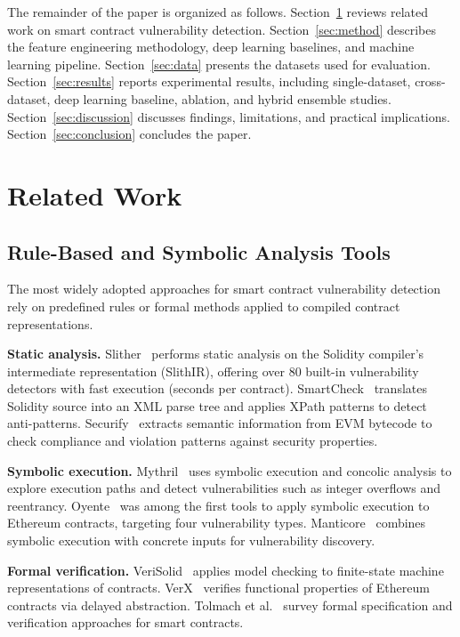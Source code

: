 \documentclass[11pt,a4paper]{article}
\begin{document}
The remainder of the paper is organized as follows.
Section~\ref{sec:related} reviews related work on smart contract vulnerability detection.
Section~\ref{sec:method} describes the feature engineering methodology, deep learning baselines, and machine learning pipeline.
Section~\ref{sec:data} presents the datasets used for evaluation.
Section~\ref{sec:results} reports experimental results, including single-dataset, cross-dataset, deep learning baseline, ablation, and hybrid ensemble studies.
Section~\ref{sec:discussion} discusses findings, limitations, and practical implications.
Section~\ref{sec:conclusion} concludes the paper.

\section{Related Work}
\label{sec:related}

\subsection{Rule-Based and Symbolic Analysis Tools}

The most widely adopted approaches for smart contract vulnerability detection rely on predefined rules or formal methods applied to compiled contract representations.

\textbf{Static analysis.}
Slither~\cite{feist2019slither} performs static analysis on the Solidity compiler's intermediate representation (SlithIR), offering over 80 built-in vulnerability detectors with fast execution (seconds per contract).
SmartCheck~\cite{tikhomirov2018smartcheck} translates Solidity source into an XML parse tree and applies XPath patterns to detect anti-patterns.
Securify~\cite{tsankov2018securify} extracts semantic information from EVM bytecode to check compliance and violation patterns against security properties.

\textbf{Symbolic execution.}
Mythril~\cite{mueller2018smashing} uses symbolic execution and concolic analysis to explore execution paths and detect vulnerabilities such as integer overflows and reentrancy.
Oyente~\cite{luu2016making} was among the first tools to apply symbolic execution to Ethereum contracts, targeting four vulnerability types.
Manticore~\cite{mossberg2019manticore} combines symbolic execution with concrete inputs for vulnerability discovery.

\textbf{Formal verification.}
VeriSolid~\cite{mavridou2019verisolid} applies model checking to finite-state machine representations of contracts.
VerX~\cite{permenev2020verx} verifies functional properties of Ethereum contracts via delayed abstraction.
Tolmach et al.~\cite{tolmach2021survey} survey formal specification and verification approaches for smart contracts.
\end{document}
